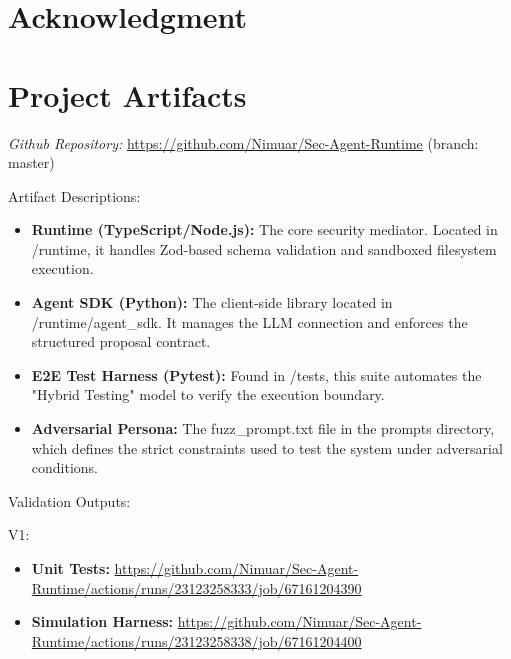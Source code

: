 \documentclass[conference]{IEEEtran}
\begin{document}
\section*{Acknowledgment}

% 
%  


\printbibliography

\appendices

\section{Project Artifacts}

\textit{Github Repository:} \hyperlink{https://github.com/Nimuar/Sec-Agent-Runtime}{https://github.com/Nimuar/Sec-Agent-Runtime} (branch: master)

Artifact Descriptions: 
\begin{itemize}
    \item \textbf{Runtime (TypeScript/Node.js):} The core security mediator. Located in /runtime, it handles Zod-based schema validation and sandboxed filesystem execution.
    \item \textbf{Agent SDK (Python):} The client-side library located in /runtime/agent\_sdk. It manages the LLM connection and enforces the structured proposal contract.
    \item \textbf{E2E Test Harness (Pytest):} Found in /tests, this suite automates the "Hybrid Testing" model to verify the execution boundary.
    \item \textbf{Adversarial Persona:} The fuzz\_prompt.txt file in the prompts directory, which defines the strict constraints used to test the system under adversarial conditions.
\end{itemize}

Validation Outputs:

V1:
\begin{itemize}
    \item \textbf{Unit Tests:} \hyperlink{https://github.com/Nimuar/Sec-Agent-Runtime/actions/runs/23123258333/job/67161204390}{https://github.com/Nimuar/Sec-Agent-Runtime/actions/runs/23123258333/job/67161204390}
    \item \textbf{Simulation Harness:} \hyperlink{https://github.com/Nimuar/Sec-Agent-Runtime/actions/runs/23123258338/job/67161204400}{https://github.com/Nimuar/Sec-Agent-Runtime/actions/runs/23123258338/job/67161204400}
\end{itemize}
\end{document}
